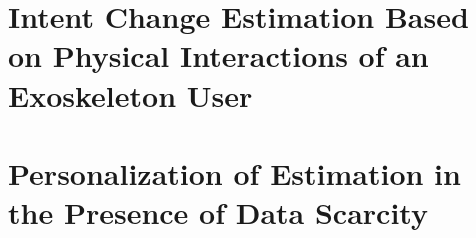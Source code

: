	
	
	 
	
	\mainmatter
	
	
	
	\chapter{Intent Change Estimation Based on Physical Interactions of an	Exoskeleton User}\label{chapter:BKF}
	\chapter{Personalization of Estimation in the Presence of Data Scarcity}\label{chapter:MP}
	
	
	\appendix
	
	
	\backmatter              %
	
	
	
	
	


\endinput
